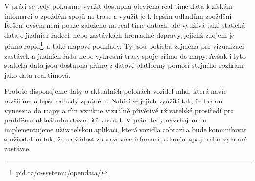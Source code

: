 \bigbreak

V práci se tedy pokusíme využít dostupná otevřená real-time data k získání infomarcí o zpoždění spojů na trase a využít je k lepším odhadům zpoždění. Řešení ovšem není pouze založeno na real-time datach, ale využívá také statická data o jízdních řádech nebo zastávkách hromadné dopravy, jejichž zdojem je přímo \gls{ropid}\footnote{pid.cz/o-systemu/opendata/}, a také mapové podklady. Ty jsou potřeba zejména pro vizualizaci zastávek a jízdních řádů nebo vykreslní trasy spoje přímo do mapy. Avšak i tyto statická data jsou dostupná přímo z datové platformy pomocí stejného rozhraní jako data real-timová.

\bigbreak

Protože disponujeme daty o aktuálních polohách vozidel \gls{mhd}, která navíc rozšíříme o lepší odhady zpoždění. Nabízí se jejich využití tak, že budou vynesena do mapy a tím vznikne vizuálně přívětivé uživatelské prostředí pro prohlížení aktuálního stavu sítě vozidel. V práci tedy navrhujeme a implementujeme uživatelskou aplikaci, která vozidla zobrazí a bude komunikovat s uživatelem tak, že na žádost zobrazí více infomací o daném spoji nebo vybrané zastávce.
